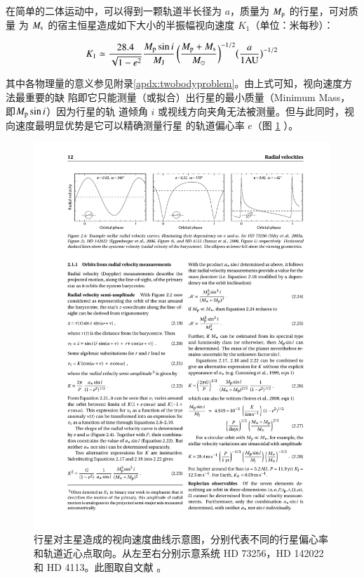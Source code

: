 在简单的二体运动中，可以得到一颗轨道半长径为 $a$，质量为 $M_\mathrm{p}$ 的行星，可对质量
为 $M_\mathrm{s}$ 的宿主恒星造成如下大小的半振幅视向速度 $K_1$（单位：米每秒）：

\begin{equation}  \label{eq:rvk} 
K_1 \simeq \frac{28.4 }{\sqrt{1-e^2}} \frac{M_\mathrm{p}\sin i}{M_\mathrm{J}} \, \bigg(\frac{M_\mathrm{p}+M_\mathrm{s}}{M_\odot}\bigg)^{-1/2} \big(\frac{a}{1 \mathrm{AU}}\big)^{-1/2}
\end{equation}  %


其中各物理量的意义参见附录\ref{apdx:twobodyproblem}。由上式可知，视向速度方法最重要的缺
陷即它只能测量（或拟合）出行星的最小质量（Minimum Mass，即$M_\mathrm{p}\sin i$）因为行星的轨
道倾角 $i$ 或视线方向夹角无法被测量。但与此同时，视向速度最明显优势是它可以精确测量行星
的轨道偏心率 $e$（图 \ref{fig:rvcurve} ）。

\begin{figure}[h!]
\centering
\includegraphics[width=1.0\textwidth]{figures/chapter1/fig5_rvcurve.pdf}
\caption[行星对主星造成的视向速度曲线示意图，从左至右分别代表不同的行星偏心率和轨道近心点取向。此图版权归 Perryman M. 所有。]{行星对主星造成的视向速度曲线示意图，分别代表不同的行星偏心率和轨道近心点取向。从左至右分别示意系统 HD 73256\cite{Udry2003HD73256}，HD 142022\cite{Eggenberger2006HD142022} 和 HD 4113\cite{Tamuz2008HD4113}。此图取自文献 。}
\label{fig:rvcurve}
\end{figure}

